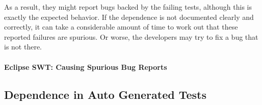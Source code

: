 As a result, they
might report bugs backed by the failing tests, although this is exactly the expected
behavior. If the dependence is not documented clearly and
correctly, it can take a considerable amount of time to work out that
these reported failures are spurious. Or worse, the developers may try
to fix a bug that is not there.

\paragraph{Eclipse SWT: Causing Spurious Bug Reports}


\subsection{Dependence in Auto Generated Tests}
\label{sec:autogen}



